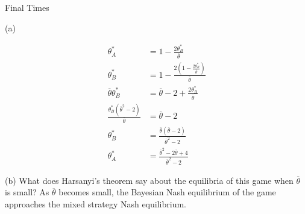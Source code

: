 \documentclass[9pt]{extarticle}
\begin{document}
\begin{problem}{Final Times}
\begin{problem}{(a)}
\begin{description}
\begin{align*}
            \theta_{A}^{\ast} &= 1-\frac{2\theta_{B}^{\ast}}{\overline{\theta}}\\
            \theta_{B}^{\ast} &= 1 - \frac{2\left(1 - \frac{2\theta_{B}^{\ast}}{\overline{\theta}}\right)}{\overline{\theta}}\\
            \overline{\theta}\theta_{B}^{\ast} &= \overline{\theta} - 2 + \frac{2\theta_{B}^{\ast}}{\overline{\theta}}\\
            \frac{ \theta_{B}^{\ast}\left(\overline{\theta}^2 - 2\right) }{ \overline{\theta} }&= \overline{\theta} - 2\\
            \theta_{B}^{\ast} &= \frac{\overline{\theta}\left(\overline{\theta} - 2\right)}{\overline{\theta}^2 - 2}\\
            \theta_{A}^{\ast} &= \frac{\overline{\theta}^{2}-2 \overline{\theta} + 4}{\overline{\theta}^{2} - 2}
          \end{align*}
      \end{description}
    \end{problem}
    \begin{problem}{(b)}
      What does Harsanyi's theorem say about the equilibria of this game when $\overline{\theta}$ is small?
      \tcblower
      As $\overline{\theta}$ becomes small, the Bayesian Nash equilibrium of the game approaches the mixed strategy Nash equilibrium.
    \end{problem}
  \end{problem}
\end{document}
